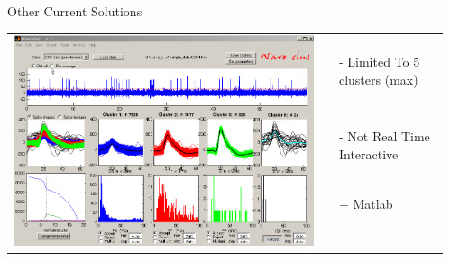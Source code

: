 \documentclass[final,t]{beamer}
\begin{document}
\begin{frame}{}
\begin{columns}[t]
\begin{column}{.3\linewidth}
\begin{block}{Other Current Solutions}
         \begin{table}
           \begin{tabular}{p{25cm} p{5cm} l}
             \multirow{6}{*}{\includegraphics[width=1.0\linewidth]{images/wave_clus.png}}
             &  & - Limited To 5 clusters (max) \\ 
             & & - Not Real Time Interactive \\
             & &  + Matlab \\
             & & \\
             & & \\
             & & \\
          \end{tabular}
         \end{table}
        
         \vskip3cm
         
     \end{block}

      


    \end{column}
    \begin{column}{.3\linewidth}
      




\end{column}
\end{columns}
\end{frame}
\end{document}
